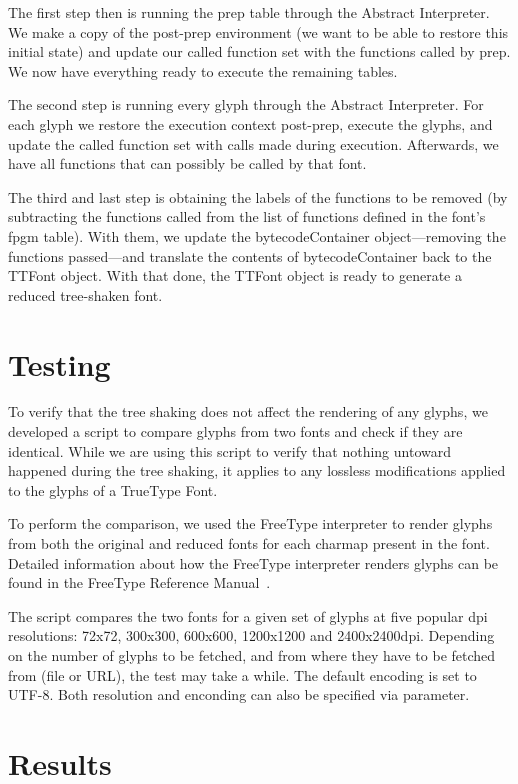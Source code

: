 \documentclass[12pt]{article}
\begin{document}
The first step then is running the prep table through the Abstract 
Interpreter. We make a copy of the post-prep environment (we want to be
able to restore this initial state) and update our called function
set with the functions called by prep. We now have everything ready to
execute the remaining tables.

The second step is running every glyph through the Abstract Interpreter.
For each glyph we restore the execution context post-prep, execute the
glyphs, and update the called function set with calls made during
execution. Afterwards, we have all functions that can possibly be called
by that font.

The third and last step is obtaining the labels of the functions
to be removed (by subtracting the functions called from the list of
functions defined in the font's fpgm table). With them, we update
the bytecodeContainer object---removing the functions passed---and
translate the contents of bytecodeContainer back to the TTFont object. 
With that done, the TTFont object is ready to generate a reduced
tree-shaken font.

\section{Testing}

To verify that the tree shaking does not affect the rendering of any glyphs,
we developed a script to compare glyphs
from two fonts and check if they are identical. While we are using this
script to verify that nothing untoward happened during the tree shaking, it
applies to any lossless modifications applied to the glyphs of
a TrueType Font.

To perform the comparison, we used the FreeType interpreter to render
glyphs from both the original and reduced fonts for each charmap present
in the font. Detailed information about how the FreeType interpreter
renders glyphs can be found in the FreeType Reference Manual~\cite{freetypemanual}. 

The script compares the two fonts for a given set of glyphs at
five popular dpi resolutions: 72x72, 300x300, 600x600, 1200x1200 and
2400x2400dpi. Depending on the number of glyphs to be fetched, and from
where they have to be fetched from (file or URL), the test may take a
while. The default encoding is set to UTF-8. Both resolution and
enconding can also be specified via parameter.

\section{Results}
\end{document}
